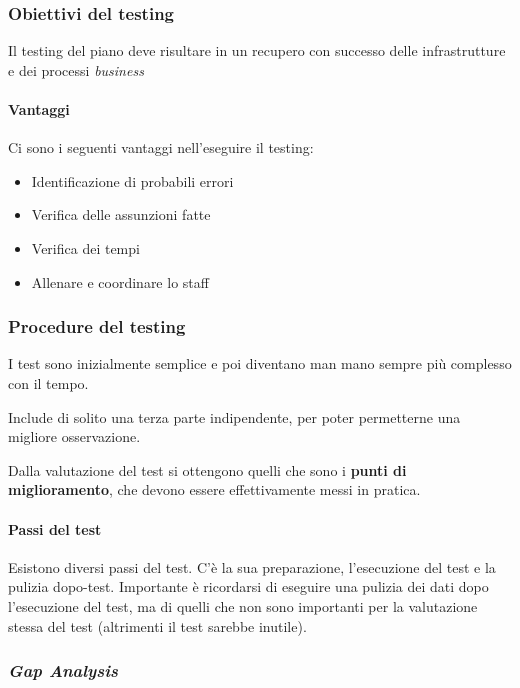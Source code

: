 \subsubsection{Obiettivi del testing}

Il testing del piano deve risultare in un recupero con successo delle 
infrastrutture e dei processi \textit{business}

\paragraph*{Vantaggi} Ci sono i seguenti vantaggi nell'eseguire il testing:
\begin{itemize}
  \item Identificazione di probabili errori
  \item Verifica delle assunzioni fatte
  \item Verifica dei tempi
  \item Allenare e coordinare lo staff
\end{itemize}

\subsubsection{Procedure del testing}


I test sono inizialmente semplice e poi diventano man mano sempre più complesso 
con il tempo.

Include di solito una terza parte indipendente, per poter permetterne una 
migliore osservazione.

Dalla valutazione del test si ottengono quelli che sono i \textbf{punti di 
miglioramento}, che devono essere effettivamente messi in pratica.

\paragraph*{Passi del test} Esistono diversi passi del test. C'è la sua 
preparazione, l'esecuzione del test e la pulizia dopo-test. Importante è 
ricordarsi di eseguire una pulizia dei dati dopo l'esecuzione del test, ma di 
quelli che non sono importanti per la valutazione stessa del test (altrimenti 
il test sarebbe inutile).

\subsubsection{\textit{Gap Analysis}}

